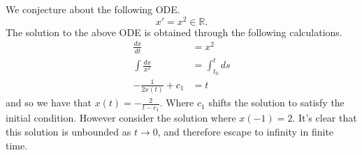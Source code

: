 \documentclass[letter]{article}
\newenvironment{menumerate}{%
  \edef\backupindent{\the\parindent}%
  \enumerate%
  \setlength{\parindent}{\backupindent}%
}{\endenumerate}
\begin{document}
\begin{menumerate}
\item We conjecture about the following ODE.
    $$x' = x^2 \in \mathbb{R}.$$
    The solution to the above ODE is obtained through the following calculations.
    \begin{equation}
        \begin{aligned}
            \frac{dx}{dt} &= x^2 \\
            \int \frac{dx}{x^2} &= \int_{t_0}^t ds \\
            -\frac{1}{2x(t)} + c_1 &= t        
        \end{aligned}
    \end{equation}
    and so we have that $x(t) = -\frac{2}{t-c_1}.$ Where $c_1$ shifts the solution to satisfy the initial condition. 
    However consider the solution where $x(-1) = 2.$ It's clear that this solution is unbounded as $t \to 0$, and therefore 
    escape to infinity in finite time.


\end{menumerate}
\end{document}
